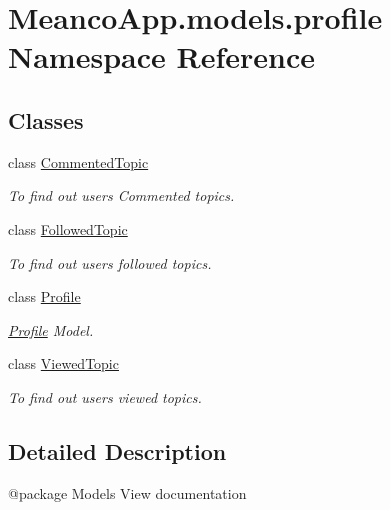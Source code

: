 \hypertarget{namespace_meanco_app_1_1models_1_1profile}{}\section{Meanco\+App.\+models.\+profile Namespace Reference}
\label{namespace_meanco_app_1_1models_1_1profile}
\subsection*{Classes}
\begin{DoxyCompactItemize}
\item 
class \hyperlink{class_meanco_app_1_1models_1_1profile_1_1_commented_topic}{Commented\+Topic}
\begin{DoxyCompactList}\small\item\em To find out users Commented topics. \end{DoxyCompactList}\item 
class \hyperlink{class_meanco_app_1_1models_1_1profile_1_1_followed_topic}{Followed\+Topic}
\begin{DoxyCompactList}\small\item\em To find out users followed topics. \end{DoxyCompactList}\item 
class \hyperlink{class_meanco_app_1_1models_1_1profile_1_1_profile}{Profile}
\begin{DoxyCompactList}\small\item\em \hyperlink{class_meanco_app_1_1models_1_1profile_1_1_profile}{Profile} Model. \end{DoxyCompactList}\item 
class \hyperlink{class_meanco_app_1_1models_1_1profile_1_1_viewed_topic}{Viewed\+Topic}
\begin{DoxyCompactList}\small\item\em To find out users viewed topics. \end{DoxyCompactList}\end{DoxyCompactItemize}


\subsection{Detailed Description}
\begin{DoxyVerb}@package Models
View documentation\end{DoxyVerb}
 
